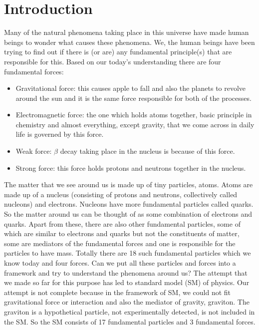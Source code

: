 
\chapter{Introduction} %

\label{Chap1} %


\newcommand{\keyword}[1]{\textbf{#1}}
\newcommand{\tabhead}[1]{\textbf{#1}}
\newcommand{\code}[1]{\texttt{#1}}
\newcommand{\file}[1]{\texttt{\bfseries#1}}
\newcommand{\option}[1]{\texttt{\itshape#1}}

Many of the natural phenomena taking place in this universe have made human beings to wonder what causes these phenomena. We, the human beings have been trying to find out if there is (or are) any fundamental principle(s) that are responsible for this. Based on our today's understanding there are four fundamental forces:
\begin{itemize}
\item Gravitational force: this causes apple to fall and also the planets to revolve around the sun and it is the same force responsible for both of the processes.
\item Electromagnetic force: the one which holds atoms together, basic principle in chemistry and almost everything, except gravity, that we come across in daily life is governed by this force.
\item Weak force: $\beta$ decay taking place in the nucleus is because of this force.
\item Strong force: this force holds protons and neutrons together in the nucleus.
\end{itemize}
The matter that we see around us is made up of tiny particles, atoms. Atoms are made up of a nucleus (consisting of protons and neutrons, collectively called nucleons) and electrons. Nucleons have more fundamental particles called quarks. So the matter around us can be thought of as some combination of electrons and quarks. Apart from these, there are also other fundamental particles, some of which are similar to electrons and quarks but not the constituents of matter, some are mediators of the fundamental forces and one is responsible for the particles to have mass. Totally there are 18 such fundamental particles which we know today and four forces. Can we put all these particles and forces into a framework and try to understand the phenomena around us? The attempt that we made so far for this purpose has led to standard model (SM) of physics. Our attempt is not complete because in the framework of SM, we could not fit gravitational force or interaction and also the mediator of gravity, graviton. The graviton is a hypothetical particle, not experimentally detected, is not included in the SM. So the SM consists of 17 fundamental particles and 3 fundamental forces.

